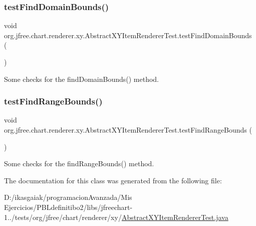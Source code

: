 \subsubsection{\texorpdfstring{test\+Find\+Domain\+Bounds()}{testFindDomainBounds()}}
{\footnotesize\ttfamily void org.\+jfree.\+chart.\+renderer.\+xy.\+Abstract\+X\+Y\+Item\+Renderer\+Test.\+test\+Find\+Domain\+Bounds (\begin{DoxyParamCaption}{ }\end{DoxyParamCaption})}

Some checks for the find\+Domain\+Bounds() method. \mbox{\label{classorg_1_1jfree_1_1chart_1_1renderer_1_1xy_1_1_abstract_x_y_item_renderer_test_a06ea4aa156d8a454285c56395d35a272}} 
\subsubsection{\texorpdfstring{test\+Find\+Range\+Bounds()}{testFindRangeBounds()}}
{\footnotesize\ttfamily void org.\+jfree.\+chart.\+renderer.\+xy.\+Abstract\+X\+Y\+Item\+Renderer\+Test.\+test\+Find\+Range\+Bounds (\begin{DoxyParamCaption}{ }\end{DoxyParamCaption})}

Some checks for the find\+Range\+Bounds() method. 

The documentation for this class was generated from the following file\+:\begin{DoxyCompactItemize}
\item 
D\+:/ikasgaiak/programacion\+Avanzada/\+Mis Ejercicios/\+P\+B\+Ldefinitibo2/libs/jfreechart-\/1../tests/org/jfree/chart/renderer/xy/\mbox{\hyperlink{_abstract_x_y_item_renderer_test_8java}{Abstract\+X\+Y\+Item\+Renderer\+Test.\+java}}\end{DoxyCompactItemize}
